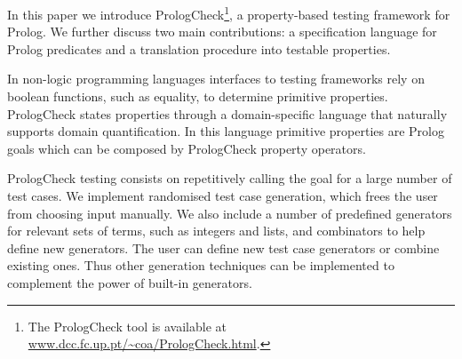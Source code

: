 \documentclass[runningheads,a4paper]{../../PaperStyles/llncs}
\newcommand{\todo}[2][?]{\marginpar{\raggedright \tiny TODO: #2}}
\newcommand{\Prolog}[0]{{\sf Prolog}}
\newcommand{\QuickCheck}[0]{{\sf QuickCheck}}
\newcommand{\plqc}[0]{{\sf PrologCheck}}
\begin{document}
In this paper we introduce \plqc{}\footnote{The \plqc{} tool is available at \url{www.dcc.fc.up.pt/~coa/PrologCheck.html}.},
a property-based testing framework for \Prolog{}.
%
We further discuss two main contributions: a specification language for \Prolog{} predicates
and a translation procedure into testable properties.





%
In non-logic programming languages interfaces to testing frameworks rely
on boolean functions, such as equality, to determine primitive properties. %
%
%
\plqc{} states properties through a domain-specific language that
naturally supports domain quantification.
%
In this language primitive properties are %
\Prolog{} goals which can be composed by \plqc{}
property operators. %



%
%
\plqc{} testing consists on repetitively calling the goal for a large number of
test cases.
%
%
%
We implement randomised test case generation, which frees the user
from choosing input manually.
%
We also include a number of predefined generators for relevant sets of
terms, such as integers and lists, and combinators to help define new
generators.
%
The user can define new test case generators or combine
existing ones.
%
Thus other generation techniques
\cite{naylor2007logic,runciman2008smallcheck,Duregard-2012-feat} can be
implemented  to complement the power of built-in generators.
%
\end{document}
